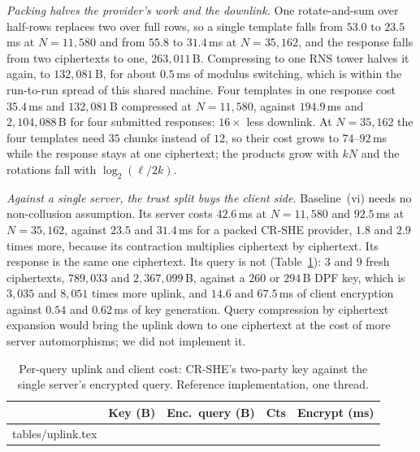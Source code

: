 \documentclass[a4paper,fleqn]{cas-dc}
\begin{document}
\emph{Packing halves the provider's work and the downlink.} One rotate-and-sum
over half-rows replaces two over full rows, so a single template falls from
$53.0$ to $23.5$\,ms at $N=11{,}580$ and from $55.8$ to $31.4$\,ms at
$N=35{,}162$, and the response falls from two ciphertexts to one,
$263{,}011$\,B. Compressing to one RNS tower halves it again, to
$132{,}081$\,B, for about $0.5$\,ms of modulus switching, which is within the
run-to-run spread of this shared machine. Four templates in one response cost
$35.4$\,ms and $132{,}081$\,B compressed at $N=11{,}580$, against $194.9$\,ms
and $2{,}104{,}088$\,B for four submitted responses: $16\times$ less downlink.
At $N=35{,}162$ the four templates need $35$ chunks instead of $12$, so their
cost grows to $74$--$92$\,ms while the response stays at one ciphertext; the
products grow with $kN$ and the rotations fall with $\log_2(\ell/2k)$.

\emph{Against a single server, the trust split buys the client side.}
Baseline~(vi) needs no non-collusion assumption. Its server costs $42.6$\,ms
at $N=11{,}580$ and $92.5$\,ms at $N=35{,}162$, against $23.5$ and $31.4$\,ms
for a packed CR-SHE provider, $1.8$ and $2.9$ times more, because its
contraction multiplies ciphertext by ciphertext. Its response is the same one
ciphertext. Its query is not (Table~\ref{tab:uplink}): $3$ and $9$ fresh
ciphertexts, $789{,}033$ and $2{,}367{,}099$\,B, against a $260$ or $294$\,B
DPF key, which is $3{,}035$ and $8{,}051$ times more uplink, and $14.6$ and
$67.5$\,ms of client encryption against $0.54$ and $0.62$\,ms of key
generation. Query compression by ciphertext expansion \citep{angel2018pir}
would bring the uplink down to one ciphertext at the cost of more server
automorphisms; we did not implement it.

\begin{table}[pos=t]
\caption{Per-query uplink and client cost: CR-SHE's two-party key against the
single server's encrypted query. Reference implementation, one thread.}
\label{tab:uplink}
\centering
\footnotesize
\setlength{\tabcolsep}{3pt}
\begin{tabular*}{\tblwidth}{@{\extracolsep{\fill}}lcccc@{}}
\toprule
 & Key (B) & Enc.\ query (B) & Cts & Encrypt (ms) \\
\midrule
{} tables/uplink.tex 
\bottomrule
\end{tabular*}
\end{table}
\end{document}
